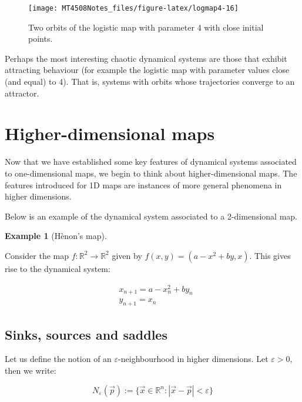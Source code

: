 \documentclass[
  a4paper,
  oneside,
  final]{krantz}
\newcommand{\R}{\mathbb{R}}
\renewcommand{\epsilon}{\varepsilon}
\theoremstyle{definition}
\theoremstyle{definition}
\newtheorem{example}{Example}[chapter]
\theoremstyle{definition}
\theoremstyle{definition}
\theoremstyle{remark}
\begin{document}
\begin{figure}

{\centering \texttt{[image: MT4508Notes\_files/figure-latex/logmap4-16]} 

}

\caption{Two orbits of the logistic map with parameter 4 with close initial points.}\label{fig:logmap4}
\end{figure}

Perhaps the most interesting chaotic dynamical systems are those that exhibit attracting behaviour (for example the logistic map with parameter values close (and equal) to 4). That is, systems with orbits whose trajectories converge to an attractor.

\hypertarget{higher-dimensional-maps}{%
\section{Higher-dimensional maps}\label{higher-dimensional-maps}}

Now that we have established some key features of dynamical systems associated to one-dimensional maps, we begin to think about higher-dimensional maps. The features introduced for 1D maps are instances of more general phenomena in higher dimensions.

Below is an example of the dynamical system associated to a 2-dimensional map.

\begin{example}[Hènon's map]
\protect\hypertarget{exm:Henonmap}{}\label{exm:Henonmap}

Consider the map \(f: \R^2 \to \R^2\) given by \(f(x,y) = (a - x^2 + by, x)\). This gives rise to the dynamical system:

\begin{align*}
&x_{n+1} = a- x_n^2 + by_n\\
&y_{n+1} = x_n
\end{align*}
\end{example}

\hypertarget{sinks-sources-and-saddles}{%
\subsection{Sinks, sources and saddles}\label{sinks-sources-and-saddles}}

Let us define the notion of an \(\epsilon\)-neighbourhood in higher dimensions. Let \(\epsilon>0\), then we write:

\[N_{\epsilon}(\vec{p}) := \{ \vec{x} \in \R^{n} : |\vec{x} - \vec{p}| < \epsilon \}\]
\end{document}
